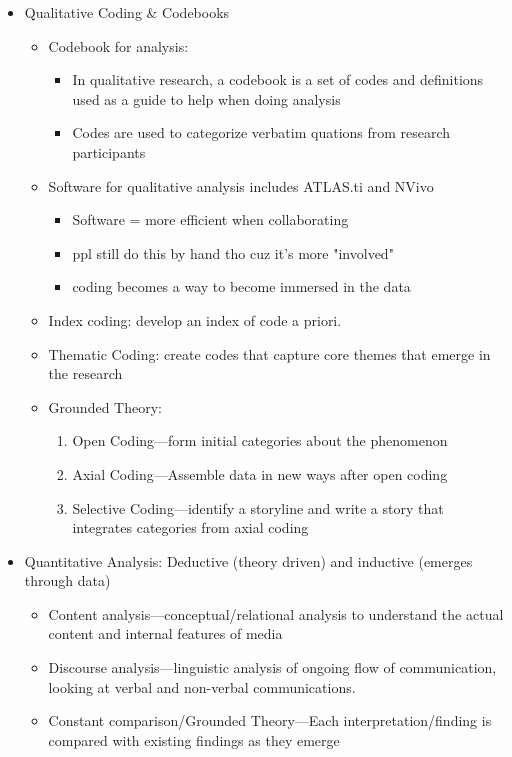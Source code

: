 \documentclass{TC}
\begin{document}
\begin{itemize}
\begin{itemize}
	\end{itemize}
\item Qualitative Coding \& Codebooks	
	\begin{itemize}
	\item Codebook for analysis:
		\begin{itemize}
		\item In qualitative research, a codebook is a set of codes and definitions used as a guide to help when doing analysis
		\item Codes are used to categorize verbatim quations from research participants
		\end{itemize}
	\item Software for qualitative analysis includes ATLAS.ti and NVivo
		\begin{itemize}
		\item Software = more efficient when collaborating
		\item ppl still do this by hand tho cuz it's more "involved"
		\item coding becomes a way to become immersed in the data
		\end{itemize}
	\item Index coding: develop an index of code a priori.
	\item Thematic Coding: create codes that capture core themes that emerge in the research
	\item Grounded Theory: 
		\begin{enumerate}
		\item Open Coding---form initial categories about the phenomenon 
		\item Axial Coding---Assemble data in new ways after open coding 
		\item Selective Coding---identify a storyline and write a story that integrates categories from axial coding
		\end{enumerate}
	\end{itemize}
\item Quantitative Analysis: Deductive (theory driven) and inductive (emerges through data)
	\begin{itemize}
	\item Content analysis---conceptual/relational analysis to understand the actual content and internal features of media
	\item Discourse analysis---linguistic analysis of ongoing flow of communication, looking at verbal and non-verbal communications.
	\item Constant comparison/Grounded Theory---Each interpretation/finding is compared with existing findings as they emerge

\end{itemize}
\end{itemize}
\end{document}
